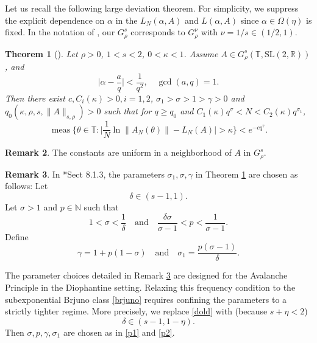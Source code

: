 \documentclass[reqno,12pt]{amsart}
\theoremstyle{plain}
\newtheorem{theorem}{Theorem}[section]
\theoremstyle{definition}
\newtheorem{remark}[theorem]{Remark}
\numberwithin{equation}{section}
\begin{document}
Let us recall the following large deviation theorem. For simplicity, we suppress the explicit dependence on $\alpha$ in the $L_{N}(\alpha,A)$ and $L(\alpha,A)$ since $\alpha\in\Omega(\eta)$ is fixed.  In the notation of \cite{MR4477429}, our $G^{s}_{\rho}$ corresponds to $G^{\nu}_{\rho}$ with $\nu=1/s\in (1/2,1)$.
\begin{theorem}[\cite{MR4477429}]\label{ldt}
    Let $\rho>0$, $1<s<2$, $0<\kappa<1$. Assume $A\in G^{s}_{\rho}(\mathbb{T},\mathrm{SL}(2,\mathbb{R}))$, and 
    \begin{equation*}
        \bigg|\alpha-\frac{a}{q} \bigg|<\frac{1}{q^{2}},  \quad \gcd(a,q)=1.
    \end{equation*}
    Then there exist $c, C_{i}(\kappa)>0, i=1,2$, $\sigma_{1}>\sigma>1>\gamma>0$ and $q_{0}(\kappa,\rho,s, \|A\|_{s,\rho})>0$ such that for $q\geqslant q_{0}$ and $C_{1}(\kappa) q^{\sigma}<N<C_{2}(\kappa)q^{\sigma_{1}}$,
    \begin{equation*}
        \operatorname{meas}\bigg\{\theta\in\mathbb{T}: \bigg|\frac{1}{N}\ln \|A_{N}(\theta)\|-L_{N}(A)\bigg|>\kappa \bigg\}<e^{-cq^{\gamma}}.
    \end{equation*}
\end{theorem}
\begin{remark}
    The constants are uniform in a neighborhood of $A$ in $G^{s}_{\rho}$.
\end{remark}
\begin{remark}\label{paraold}
    In \cite{MR4477429}*{Sect 8.1.3}, the parameters $\sigma_{1},\sigma,\gamma$ in Theorem \ref{ldt} are chosen as follows: Let 
    \begin{equation}\label{dold}
        \delta\in (s-1,1).
    \end{equation}
    Let $\sigma>1$ and $p\in\mathbb{N}$ such that
    \begin{equation}\label{p1}
        1<\sigma<\frac{1}{\delta}\quad \text{and}\quad \frac{\delta\sigma}{\sigma-1}<p<\frac{1}{\sigma-1}.
    \end{equation}
    Define
    \begin{equation}\label{p2}
        \gamma=1+p(1-\sigma)\quad \text{and}\quad \sigma_{1}=\frac{p(\sigma-1)}{\delta}.
    \end{equation}
\end{remark}

The parameter choices detailed in Remark \ref{paraold} are designed for the Avalanche Principle in the Diophantine setting. Relaxing this frequency condition to the subexponential Brjuno class \eqref{brjuno} requires confining the parameters to a strictly tighter regime. More precisely, we replace \eqref{dold} with (because $s+\eta<2$)
\begin{equation*}
    \delta\in (s-1,1-\eta).
\end{equation*}
Then $\sigma,p,\gamma,\sigma_{1}$ are chosen as in \eqref{p1} and \eqref{p2}. 
\end{document}
